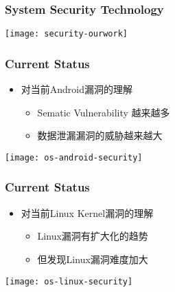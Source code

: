 \begin{frame}[plain]	
	\frametitle{System Security Technology}

	
	\centering
	\texttt{[image: security-ourwork]}
	
\end{frame}

\begin{frame}[plain]	
	\frametitle{Current Status}
	
	\begin{itemize}\large
		\item 对当前Android漏洞的理解
		\begin{itemize}\large
			\item Sematic Vulnerability 越来越多
			\item 数据泄漏漏洞的威胁越来越大
		\end{itemize}
		
		
	\end{itemize}	
	
	\centering
	\texttt{[image: os-android-security]}
	
\end{frame}

\begin{frame}[plain]	
	\frametitle{Current Status}
	
	\begin{itemize}\large
		\item 对当前Linux Kernel漏洞的理解
		\begin{itemize}\large
			\item Linux漏洞有扩大化的趋势
			\item 但发现Linux漏洞难度加大
		\end{itemize}
		
		
	\end{itemize}	
	
	\centering
	\texttt{[image: os-linux-security]}
	
\end{frame}
